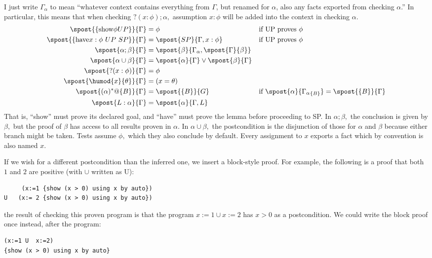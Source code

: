 \documentclass[12pt]{cmuthesis}
\theoremstyle{definition}
\theoremstyle{remark}
\newcommand{\G}{\Gamma}
\begin{document}
I just write $\G_\alpha$ to mean ``whatever context contains everything from $\G$, but renamed for $\alpha$, also any facts exported from checking $\alpha$.''
In particular, this means that when checking $?(x:\phi);\alpha,$ assumption $x:\phi$ will be added into the context in checking $\alpha$.
\begin{align*}
\spost{\{\text{show} \phi UP\}}{\G}       &= \phi                                               &&\text{if UP proves }\phi\\
\spost{\{\text{have} x:\phi~UP~SP\}}{\G} &= \spost{SP}{\G,x:\phi}                           &&\text{if UP proves }\phi\\
\spost{\alpha;\beta}{\G}                       &= \spost{\beta}{\G_\alpha,\spost{\G}{\beta}} &&\\
\spost{\alpha\cup\beta}{\G}                  &= \spost{\alpha}{\G} \vee \spost{\beta}{\G}    &&\\
\spost{?(x:\phi)}{\G} &= \phi &&\\
\spost{\humod{x}{\theta}}{\G} &=(x=\theta) &&\\
\spost{(\alpha)^*@\{B\}}{\G} &= \spost{\{B\}}{G} &&\text{if }\spost{\alpha}{{\G_\alpha}_{\{B\}}}=\spost{\{B\}}{\G}\\
\spost{L: \alpha}{\G} &= \spost{\alpha}{\G,L} 
\end{align*}
That is, ``show'' must prove its declared goal, and ``have'' must prove the lemma before proceeding to SP.
In $\alpha;\beta,$ the conclusion is given by $\beta,$ but the proof of $\beta$ has access to all results proven in $\alpha$.
In $\alpha\cup\beta,$ the postcondition is the disjunction of those for $\alpha$ and $\beta$ because either branch might be taken.
Tests assume $\phi,$ which they also conclude by default.
Every assignment to $x$ exports a fact which by convention is also named $x$.

If we wish for a different postcondition than the inferred one, we insert a block-style proof.
For example, the following is a proof that both $1$ and $2$ are positive (with $\cup$ written as U):
\begin{verbatim}
     (x:=1 {show (x > 0) using x by auto})
U   (x:= 2 {show (x > 0) using x by auto})
\end{verbatim}
the result of checking this proven program is that the program $x{:=}1 \cup x{:=}2$ has $x > 0$ as a postcondition.
We could write the block proof once instead, after the program:
\begin{verbatim}
(x:=1 U  x:=2)
{show (x > 0) using x by auto}
\end{verbatim}
\end{document}
